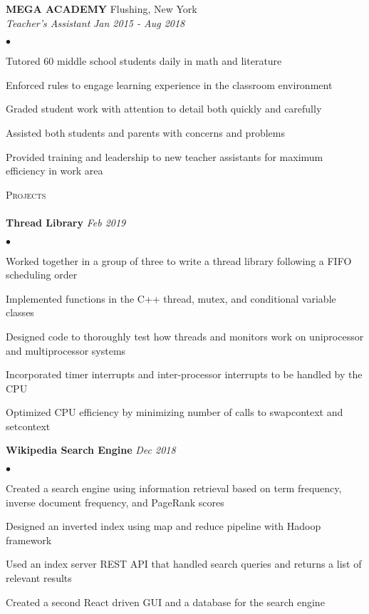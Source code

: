 \documentclass{article}
\newcommand{\lineunder}{\vspace*{-8pt} \\ \hspace*{-18pt} \hrulefill \\}
\newcommand{\header}[1]{{\hspace*{-15pt}\vspace*{6pt} \textsc{#1}} 
    \vspace*{-6pt} \lineunder}
\newcommand{\employer}[4]{{ \textbf{\uppercase{#1}} \hfill#2\\ 
    \emph{#3}} \hfill\textit{#4} \vspace*{1pt}}
\newenvironment{achievements}{\begin{list}{$\bullet$}{\topsep 0pt \itemsep 
    -2pt}}{\vspace*{4pt}\end{list}}
\begin{document}
      \employer{MEGA ACADEMY}{Flushing, New York}
      {Teacher's Assistant}{Jan 2015 - Aug 2018}
          \begin{achievements}
          \item Tutored 60 middle school students daily in math and literature
          \item Enforced rules to engage learning experience in the classroom environment
          \item Graded student work with attention to detail both quickly and carefully
          \item Assisted both students and parents with concerns and problems
          \item Provided training and leadership to new teacher assistants for maximum efficiency in work area
          \end{achievements}
    
      
    \header{Projects}

    \textbf{Thread Library} \hspace*{0pt}\hfill \textit{Feb 2019}
    \begin{achievements}
        \item Worked together in a group of three to write a thread library following a FIFO scheduling order
        \item Implemented functions in the C++ thread, mutex, and conditional variable classes
        \item Designed code to thoroughly test how threads and monitors work on uniprocessor and multiprocessor systems
        \item Incorporated timer interrupts and inter-processor interrupts to be handled by the CPU 
        \item Optimized CPU efficiency by minimizing number of calls to swapcontext and setcontext
    \end{achievements}

    \textbf{Wikipedia Search Engine} \hspace*{0pt}\hfill \textit{Dec 2018}
    \begin{achievements}
        \item Created a search engine using information retrieval based on term frequency, inverse document frequency, and PageRank scores
        \item Designed an inverted index using map and reduce pipeline with Hadoop framework 
        \item Used an index server REST API that handled search queries and returns a list of relevant results
        \item Created a second React driven GUI and a database for the search engine  
    \end{achievements}
\end{document}
